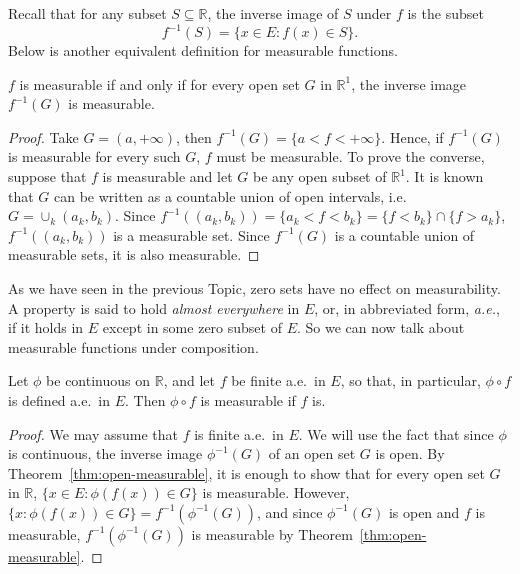 \documentclass[11pt]{article}
\begin{document}
Recall that for any subset $S \subseteq \mathbb{R}$, the inverse image of $S$ under $f$ is the subset
\[
  f^{-1}(S) = \{ x \in E \colon f(x) \in S \}.
\]
Below is another equivalent definition for measurable functions.

\begin{thm}
  \label{thm:open-measurable}
  $f$ is measurable if and only if for every open set $G$ in $\mathbb{R}^1$, the inverse image $f^{-1}(G)$ is measurable.
\end{thm}

\begin{proof}
  Take $G = (a, +\infty)$, then $f^{-1}(G) = \{ a < f < +\infty \}$.  Hence, if $f^{-1}(G)$ is measurable for every such $G$, $f$ must be measurable.  To prove the converse, suppose that $f$ is measurable and let $G$ be any open subset of $\mathbb{R}^1$.  It is known that $G$ can be written as a countable union of open intervals, i.e. $G = \cup_k (a_k, b_k)$.  Since $f^{-1}( (a_k, b_k) ) = \{ a_k < f < b_k \} = \{ f < b_k \} \cap \{ f > a_k \}$, $f^{-1}( (a_k, b_k) )$ is a measurable set.  Since $f^{-1}(G)$ is a countable union of measurable sets, it is also measurable.
\end{proof}

As we have seen in the previous Topic, zero sets have no effect on measurability.  A property is said to hold \textit{almost everywhere} in $E$, or, in abbreviated form, \textit{a.e.}, if it holds in $E$ except in some zero subset of $E$.  So we can now talk about measurable functions under composition.

\begin{thm}
  \label{thm:measurable-composition}
  Let $\phi$ be continuous on $\mathbb{R}$, and let $f$ be finite a.e.\ in $E$, so that, in particular, $\phi \circ f$ is defined a.e.\ in $E$.  Then $\phi\circ f$ is measurable if $f$ is.
\end{thm}

\begin{proof}
  We may assume that $f$ is finite a.e.\ in $E$.  We will use the fact that since $\phi$ is continuous, the inverse image $\phi^{-1}(G)$ of an open set $G$ is open.  By Theorem~\ref{thm:open-measurable}, it is enough to show that for every open set $G$ in $\mathbb{R}$, $\{ x \in E \colon \phi(f(x)) \in G \}$ is measurable.  However, $\{ x \colon \phi(f(x)) \in G \} = f^{-1}(\phi^{-1}(G))$, and since $\phi^{-1}(G)$ is open and $f$ is measurable, $f^{-1}(\phi^{-1}(G))$ is measurable by Theorem~\ref{thm:open-measurable}.
\end{proof}
\end{document}

